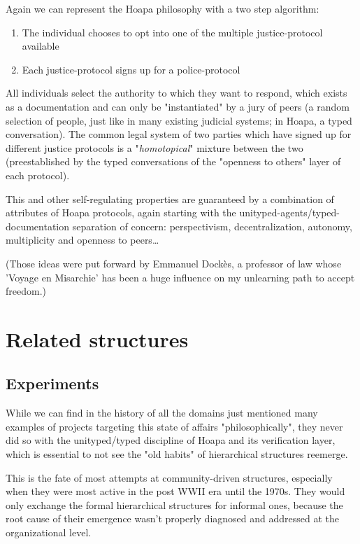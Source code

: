 \documentclass[11pt]{article}
\begin{document}
Again we can represent the Hoapa philosophy with a two step algorithm:

\begin{enumerate}

\item The individual chooses to opt into one of the multiple justice-protocol available

\item Each justice-protocol signs up for a police-protocol

\end{enumerate}

All individuals select the authority to which they want to respond, which exists as a documentation and can only be "instantiated" by a jury of peers (a random selection of people, just like in many existing judicial systems; in Hoapa, a typed conversation). The common legal system of two parties which have signed up for different justice protocols is a "\emph{homotopical}" mixture between the two (preestablished by the typed conversations of the "openness to others" layer of each protocol).

This and other self-regulating properties are guaranteed by a combination of attributes of Hoapa protocols, again starting with the unityped-agents/typed-documentation separation of concern: perspectivism, decentralization, autonomy, multiplicity and openness to peers\ldots{}

(Those ideas were put forward by Emmanuel Dockès, a professor of law whose 'Voyage en Misarchie' has been a huge influence on my unlearning path to accept freedom.)

\section{Related structures}

\subsection{Experiments}

While we can find in the history of all the domains just mentioned many examples of projects targeting this state of affairs "philosophically", they never did so with the unityped/typed discipline of Hoapa and its verification layer, which is essential to not see the "old habits" of hierarchical structures reemerge.

This is the fate of most attempts at community-driven structures, especially when they were most active in the post WWII era until the 1970s. They would only exchange the formal hierarchical structures for informal ones, because the root cause of their emergence wasn't properly diagnosed and addressed at the organizational level.
\end{document}
